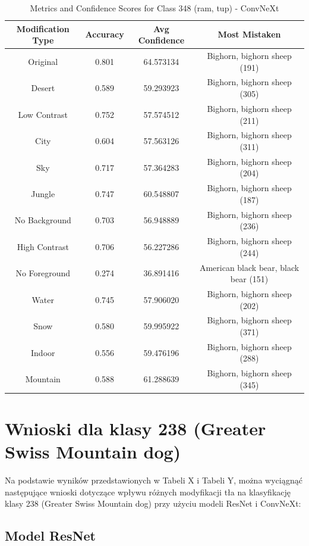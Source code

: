 \begin{table}
	\centering
	\begin{tabular}{|c|c|c|c|}
		\hline
		\textbf{Modification Type} & \textbf{Accuracy} & \textbf{Avg Confidence} & \textbf{Most Mistaken} \\
		\hline
		Original & 0.801 & 64.573134 & Bighorn, bighorn sheep (191) \\
		\hline
		Desert & 0.589 & 59.293923 & Bighorn, bighorn sheep (305) \\
		\hline
		Low Contrast & 0.752 & 57.574512 & Bighorn, bighorn sheep (211) \\
		\hline
		City & 0.604 & 57.563126 & Bighorn, bighorn sheep (311) \\
		\hline
		Sky & 0.717 & 57.364283 & Bighorn, bighorn sheep (204) \\
		\hline
		Jungle & 0.747 & 60.548807 & Bighorn, bighorn sheep (187) \\
		\hline
		No Background & 0.703 & 56.948889 & Bighorn, bighorn sheep (236) \\
		\hline
		High Contrast & 0.706 & 56.227286 & Bighorn, bighorn sheep (244) \\
		\hline
		No Foreground & 0.274 & 36.891416 & American black bear, black bear (151) \\
		\hline
		Water & 0.745 & 57.906020 & Bighorn, bighorn sheep (202) \\
		\hline
		Snow & 0.580 & 59.995922 & Bighorn, bighorn sheep (371) \\
		\hline
		Indoor & 0.556 & 59.476196 & Bighorn, bighorn sheep (288) \\
		\hline
		Mountain & 0.588 & 61.288639 & Bighorn, bighorn sheep (345) \\
		\hline
	\end{tabular}
	\caption{Metrics and Confidence Scores for Class 348 (ram, tup) - ConvNeXt}
	\label{tab:metrics_confidence_class_348_convnext}
\end{table}

\section*{Wnioski dla klasy 238 (Greater Swiss Mountain dog)}

Na podstawie wyników przedstawionych w Tabeli X i Tabeli Y, można wyciągnąć następujące wnioski dotyczące wpływu różnych modyfikacji tła na klasyfikację klasy 238 (Greater Swiss Mountain dog) przy użyciu modeli ResNet i ConvNeXt:

\subsection*{Model ResNet}

